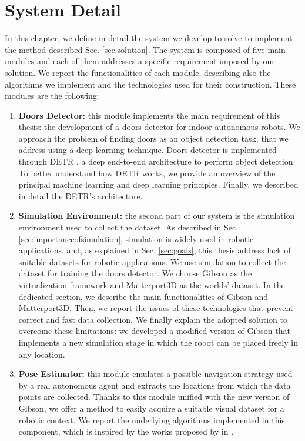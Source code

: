 \chapter{System Detail}

In this chapter, we define in detail the system we develop to solve to implement the method described Sec. \ref{sec:solution}. The system is composed of five main modules and each of them addresses a specific requirement imposed by our solution. We report the functionalities of each module, describing also the algorithms we implement and the technologies used for their construction. These modules are the following:

\begin{enumerate}
	\item \textbf{Doors Detector:} this module implements the main requirement of this thesis: the development of a doors detector for indoor autonomous robots. We approach the problem of finding doors as an object detection task, that we address using a deep learning technique. Doors detector is implemented through DETR \cite{DETR}, a deep end-to-end architecture to perform object detection. To better understand how DETR works, we provide an overview of the principal machine learning and deep learning principles. Finally, we described in detail the DETR's architecture. 
	\item \textbf{Simulation Environment:} the second part of our system is the simulation environment used to collect the dataset. As described in Sec. \ref{sec:importanceofsimulation}, simulation is widely used in robotic applications, and, as explained in Sec. \ref{sec:goals}, this thesis address lack of suitable datasets for robotic applications. We use simulation to collect the dataset for training the doors detector. We choose Gibson \cite{gibson} as the virtualization framework and Matterport3D \cite{matterport} as the worlds' dataset. In the dedicated section, we describe the main functionalities of Gibson and Matterport3D. Then, we report the issues of these technologies that prevent correct and fast data collection. We finally explain the adopted solution to overcome these limitations: we developed a modified version of Gibson that implements a new simulation stage in which the robot can be placed freely in any location.
	\item \textbf{Pose Estimator:} this module emulates a possible navigation strategy used by a real autonomous agent and extracts  the locations from which the data points are collected. Thanks to this module unified with the new version of Gibson, we offer a method to easily acquire a suitable visual dataset for a robotic context. We report the underlying algorithms implemented in this component, which is inspired by the works proposed by \citeauthor{repeatabilityslam} in \cite{repeatabilityslam, repeatabilityslamarxiv}.

\end{enumerate}
